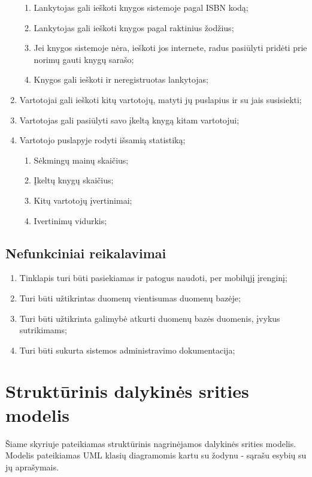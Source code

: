 \documentclass{VUMIFPSkursinis}
\begin{document}
\begin{enumerate}[label=\textbf{FR\arabic*}]
			\begin{enumerate}[label*=\textbf{.\arabic*}]
				\item Lankytojas gali ieškoti knygos sistemoje pagal ISBN kodą;
				\item Lankytojas gali ieškoti knygos pagal raktinius žodžius;
				\item Jei knygos sistemoje nėra, ieškoti jos internete, radus pasiūlyti pridėti
					prie norimų gauti knygų sarašo;
				\item Knygos gali ieškoti ir neregistruotas lankytojas;
			\end{enumerate}
		\item Vartotojai gali ieškoti kitų vartotojų, matyti jų puslapius ir su jais susisiekti;
		\item Vartotojas gali pasiūlyti savo įkeltą knygą kitam vartotojui;
		\item Vartotojo puslapyje rodyti išsamią statistiką;
			\begin{enumerate}[label*=\textbf{.\arabic*}]
				\item Sėkmingų mainų skaičius;
				\item Įkeltų knygų skaičius; 
				\item Kitų vartotojų įvertinimai;
				\item Ivertinimų vidurkis;
			\end{enumerate}
	\end{enumerate}
\subsection{Nefunkciniai reikalavimai}
	\begin{enumerate}[label=\textbf{NFR\arabic*}]
		\item Tinklapis turi būti pasiekiamas ir patogus naudoti, per mobilųjį įrenginį;
		\item Turi būti užtikrintas duomenų vientisumas duomenų bazėje;
		\item Turi būti užtikrinta galimybė atkurti duomenų bazės duomenis, įvykus sutrikimams;
		\item Turi būti sukurta sistemos administravimo dokumentacija;
	\end{enumerate}

\section{Struktūrinis dalykinės srities modelis}
	Šiame skyriuje pateikiamas struktūrinis nagrinėjamos dalykinės srities modelis. 
	Modelis pateikiamas UML klasių diagramomis kartu su žodynu - sąrašu esybių su jų aprašymais. 
\end{document}
